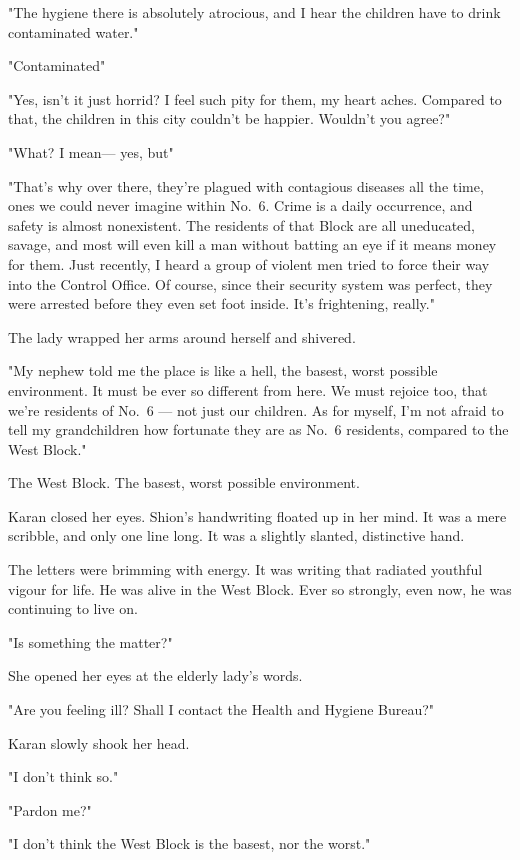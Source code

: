 "The hygiene there is absolutely atrocious, and I hear the children have
to drink contaminated water."

"Contaminated\el "

"Yes, isn't it just horrid? I feel such pity for them, my heart aches.
Compared to that, the children in this city couldn't be happier.
Wouldn't you agree?"

"What? I mean--- yes, but\el "

"That's why over there, they're plagued with contagious diseases all the
time, ones we could never imagine within No.~6. Crime is a daily
occurrence, and safety is almost nonexistent. The residents of that
Block are all uneducated, savage, and most will even kill a man without
batting an eye if it means money for them. Just recently, I heard a
group of violent men tried to force their way into the Control Office.
Of course, since their security system was perfect, they were arrested
before they even set foot inside. It's frightening, really."

The lady wrapped her arms around herself and shivered.

"My nephew told me the place is like a hell, the basest, worst possible
environment. It must be ever so different from here. We must rejoice
too, that we're residents of No.~6 --- not just our children. As for
myself, I'm not afraid to tell my grandchildren how fortunate they are
as No.~6 residents, compared to the West Block."

The West Block. The basest, worst possible environment.

Karan closed her eyes. Shion's handwriting floated up in her mind. It
was a mere scribble, and only one line long. It was a slightly slanted,
distinctive hand.


The letters were brimming with energy. It was writing that radiated
youthful vigour for life. He was alive in the West Block. Ever so
strongly, even now, he was continuing to live on.

"Is something the matter?"

She opened her eyes at the elderly lady's words.

"Are you feeling ill? Shall I contact the Health and Hygiene Bureau?"

Karan slowly shook her head.

"I don't think so."

"Pardon me?"

"I don't think the West Block is the basest, nor the worst."

